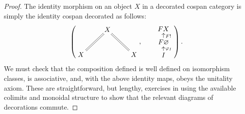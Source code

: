 \begin{proof}
  The identity morphism on an object $X$ in a decorated cospan category is
  simply the identity cospan decorated as follows:
  \[
    \left(
    \begin{aligned}
      \xymatrix{
	& X \\  
	X \ar@{=}[ur] && X \ar@{=}[ul]
      }
    \end{aligned}
    ,
    \qquad
    \begin{aligned}
      \xymatrixrowsep{.5pc}
      \xymatrix{
	FX \\
	F\varnothing \ar[u]_{F!} \\
	I \ar[u]_{\varphi_I}
      }
    \end{aligned}
    \right).
  \]
  We must check that the composition defined is well defined on isomorphism
  classes, is associative, and, with the above identity maps, obeys the
  unitality axiom. These are straightforward, but lengthy, exercises in
  using the available colimits and monoidal structure to show that
  the relevant diagrams of decorations commute.


\end{proof}
